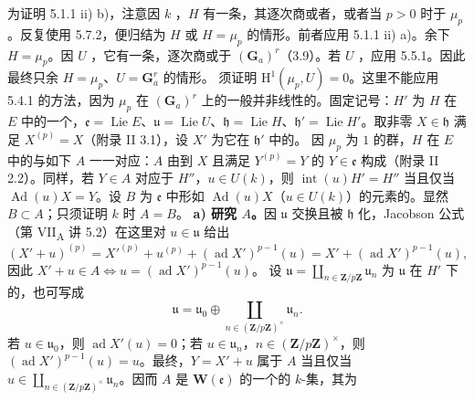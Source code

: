 为证明 5.1.1 ii) b)，注意因 $k$ ，$H$ 有一条，其逐次商或者，或者当 $p>0$ 时于 $\mu_p$。反复使用 5.7.2，便归结为 $H$ 或 $H=\mu_p$ 的情形。前者应用 5.1.1 ii) a)。余下 $H=\mu_p$。因 $U$ ，它有一条，逐次商或于 $(\mathbf G_a)^r$（3.9）。若 $U$ ，应用 5.5.1。因此最终只余 $H=\mu_p$、$U=\mathbf G_a^r$ 的情形。
须证明 $\mathrm H^1(\mu_p,U)=0$。这里不能应用 5.4.1 的方法，因为 $\mu_p$ 在 $(\mathbf G_a)^r$ 上的一般并非线性的。固定记号：$H'$ 为 $H$ 在 $E$ 中的一个，$\mathfrak e=\operatorname{Lie}E$、$\mathfrak u=\operatorname{Lie}U$、$\mathfrak h=\operatorname{Lie}H$、$\mathfrak h'=\operatorname{Lie}H'$。取非零 $X\in\mathfrak h$ 满足 $X^{(p)}=X$（附录 II 3.1），设 $X'$ 为它在 $\mathfrak h'$ 中的。
因 $\mu_p$ 为 $1$ 的群，$H$ 在 $E$ 中的与如下 $A$ 一一对应：$A$ 由到 $X$ 且满足 $Y^{(p)}=Y$ 的 $Y\in\mathfrak e$ 构成（附录 II 2.2）。同样，若 $Y\in A$ 对应于 $H''$，$u\in U(k)$，则 $\operatorname{int}(u)H'=H''$ 当且仅当 $\operatorname{Ad}(u)X=Y$。设 $B$ 为 $\mathfrak e$ 中形如 $\operatorname{Ad}(u)X$（$u\in U(k)$）的元素的。显然 $B\subset A$；只须证明 $k$ 时 $A=B$。
\textbf{a) 研究 $A$。}因 $\mathfrak u$ 交换且被 $\mathfrak h$ 化，Jacobson 公式（第 VII\textsubscript{A} 讲 5.2）在这里对 $u\in\mathfrak u$ 给出
\[(X'+u)^{(p)}=X'^{(p)}+u^{(p)}+(\operatorname{ad}X')^{p-1}(u)
=X'+(\operatorname{ad}X')^{p-1}(u),\]
因此 $X'+u\in A\Leftrightarrow u=(\operatorname{ad}X')^{p-1}(u)$。
设 $\mathfrak u=\coprod_{n\in\mathbf Z/p\mathbf Z}\mathfrak u_n$ 为 $\mathfrak u$ 在 $H'$ 下的，也可写成
\[\mathfrak u=\mathfrak u_0\oplus\coprod_{n\in(\mathbf Z/p\mathbf Z)^\times}\mathfrak u_n.\]
若 $u\in\mathfrak u_0$，则 $\operatorname{ad}X'(u)=0$；若 $u\in\mathfrak u_n$，$n\in(\mathbf Z/p\mathbf Z)^\times$，则 $(\operatorname{ad}X')^{p-1}(u)=u$。最终，$Y=X'+u$ 属于 $A$ 当且仅当 $u\in\coprod_{n\in(\mathbf Z/p\mathbf Z)^\times}\mathfrak u_n$。因而 $A$ 是 $\mathbf W(\mathfrak e)$ 的一个的 $k$-集，其为
